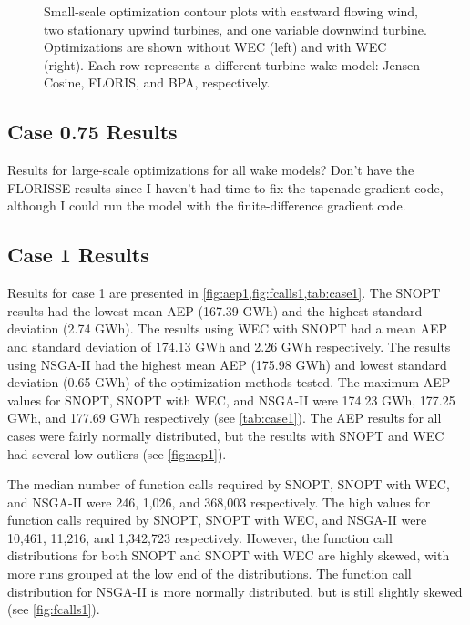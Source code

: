 \documentclass[a4paper]{jpconf}
\begin{document}
\begin{figure}[H]
{    }
    \caption{Small-scale optimization contour plots with eastward flowing wind, two stationary upwind turbines, and one variable downwind turbine. Optimizations are shown without WEC (left) and with WEC (right). Each row represents a different turbine wake model: Jensen Cosine, FLORIS, and BPA, respectively.}
    \label{fig:SmallScaleOptimizations}
\end{figure}

\subsection{Case 0.75 Results}
Results for large-scale optimizations for all wake models? Don't have the FLORISSE results since I haven't had time to fix the tapenade gradient code, although I could run the model with the finite-difference gradient code.

\subsection{Case 1 Results}
Results for case 1 are presented in \cref{fig:aep1,fig:fcalls1,tab:case1}. The SNOPT results had the lowest mean AEP (167.39 GWh) and the highest standard deviation (2.74 GWh). The results using WEC with SNOPT had a mean AEP and standard deviation of 174.13 GWh and 2.26 GWh respectively. The results using NSGA-II had the highest mean AEP (175.98 GWh) and lowest standard deviation (0.65 GWh) of the optimization methods tested. The maximum AEP values for SNOPT, SNOPT with WEC, and NSGA-II were 174.23 GWh, 177.25 GWh, and 177.69 GWh respectively (see \cref{tab:case1}). The AEP results for all cases were fairly normally distributed, but the results with SNOPT and WEC had several low outliers (see \cref{fig:aep1}).

 The median number of function calls required by SNOPT, SNOPT with WEC, and NSGA-II were 246, 1,026, and 368,003 respectively. The high values for function calls required by SNOPT, SNOPT with WEC, and NSGA-II were 10,461, 11,216, and 1,342,723 respectively. However, the function call distributions for both SNOPT and SNOPT with WEC are highly skewed, with more runs grouped at the low end of the distributions. The function call distribution for NSGA-II is more normally distributed, but is still slightly skewed (see \cref{fig:fcalls1}).
\end{document}
